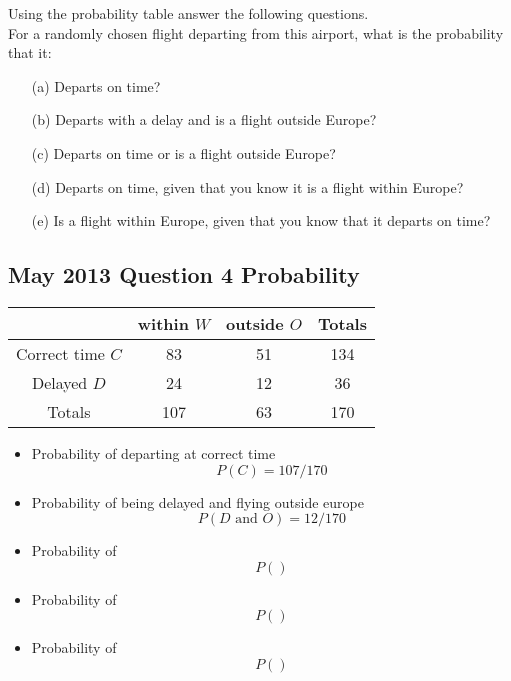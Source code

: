 \documentclass[a4paper,12pt]{article}
\begin{document}
Using the probability table answer the following questions. \\
\bigskip
For a randomly chosen flight departing from this airport, what is the probability that it: 
\begin{itemize}
	\item[(a)] Departs on time? 
	\item[(b)] Departs with a delay and is a flight outside Europe? 
	
	\item[(c)] Departs on time or is a flight outside Europe? 
	\item[(d)] Departs on time, given that you know it is a flight within Europe? 
	
	\item[(e)] Is a flight within Europe, given that you know that it departs on time?
\end{itemize}


\subsection*{May 2013 Question 4 Probability}
\begin{center}
	\begin{tabular}{|c|c|c|c|}
		\hline  & within $W$ & outside $O$ & Totals \\ 
		\hline Correct time $C$ & 83 & 51 & 134 \\ 
		\hline Delayed $D$ & 24 & 12 & 36 \\ 
		\hline Totals & 107 & 63 & 170 \\ 
		\hline 
	\end{tabular} 
\end{center}\begin{itemize}
\item Probability of departing at correct time
\[P(C) = 107/170\]



\item Probability of being delayed and flying outside europe 
\[P(D  \mbox{ and } O) = 12/170\]
\item Probability of 
\[P() \]
\item Probability of 
\[P() \]
\item Probability of 
\[P() \]
\end{itemize}
\end{document}
